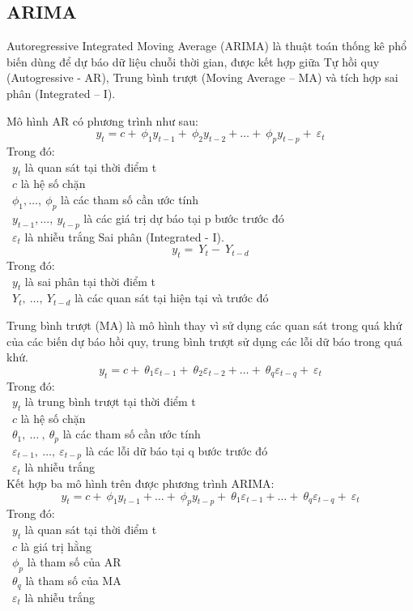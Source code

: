 \subsection{ARIMA}
Autoregressive Integrated Moving Average (ARIMA) là thuật toán thống kê phổ biến dùng để dự báo dữ liệu chuỗi thời gian, được kết hợp giữa Tự hồi quy (Autogressive - AR), Trung bình trượt (Moving Average – MA) và tích hợp sai phân (Integrated – I).
\par
Mô hình AR có phương trình như sau:
\[y_{t} = c + \ \phi_{1}y_{t - 1} + \ \phi_{2}y_{t - 2} + \ldots + \ \phi_{p}y_{t - p} + \ \varepsilon_{t}\]
Trong đó:\\
    \indent\textbullet\ \(y_{t}\) là quan sát tại thời điểm t\\
    \indent\textbullet\ \(c\) là hệ số chặn\\
    \indent\textbullet\ \(\phi_{1},\ldots,\ \phi_{p}\) là các tham số cần ước tính\\
    \indent\textbullet\ \(y_{t - 1},...,\ y_{t - p}\) là các giá trị dự báo tại p bước trước đó\\
    \indent\textbullet\ \(\varepsilon_{t}\) là nhiễu trắng Sai phân (Integrated - I).
\[y_{t} = \ Y_{t} - \ Y_{t - d}\]
Trong đó:\\
    \indent\textbullet\ \(y_{t}\) là sai phân tại thời điểm t\\
    \indent\textbullet\ \(Y_{t},\ \ldots,\ Y_{t - d}\) là các quan sát tại hiện tại và trước đó

Trung bình trượt (MA) là mô hình thay vì sử dụng các quan sát trong quá khứ của các biến dự báo hồi quy, trung bình trượt sử dụng các lỗi dữ báo trong quá khứ.
\[y_{t} = c + \ \theta_{1}\varepsilon_{t - 1} + \ \theta_{2}\varepsilon_{t - 2} + \ldots + \ \theta_{q}\varepsilon_{t - q} + \ \varepsilon_{t}\]
Trong đó:\\
    \indent\textbullet\ \(y_{t}\) là trung bình trượt tại thời điểm t\\
    \indent\textbullet\ \(c\) là hệ số chặn\\
    \indent\textbullet\ \(\theta_{1},\ \ldots\ ,\ \theta_{p}\) là các tham số cần ước tính\\
    \indent\textbullet\ \(\varepsilon_{t - 1},\ \ldots,\ \varepsilon_{t - p}\) là các lỗi dữ báo tại q bước trước đó\\
    \indent\textbullet\ \(\varepsilon_{t}\) là nhiễu trắng
\\Kết hợp ba mô hình trên được phương trình ARIMA:
\[y_{t} = c + \ \phi_{1}y_{t - 1} + \ldots + \ \phi_{p}y_{t - p} + \ \theta_{1}\varepsilon_{t - 1} + \ldots + \ \theta_{q}\varepsilon_{t - q} + \ \varepsilon_{t}\]
Trong đó:\\
    \indent\textbullet\ \(y_{t}\) là quan sát tại thời điểm t\\
    \indent\textbullet\ \(c\) là giá trị hằng\\
    \indent\textbullet\ \(\phi_{p}\) là tham số của AR\\
    \indent\textbullet\ \(\theta_{q}\) là tham số của MA\\
    \indent\textbullet\ \(\varepsilon_{t}\) là nhiễu trắng

